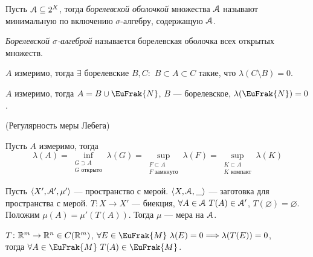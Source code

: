 \begin{definition}
    Пусть $\mathcal{A} \subseteq 2^X$, тогда \textit{борелевской оболочкой} множества $\mathcal{A}$
    называют минимальную по включению $\sigma$-алгебру, содержащую $\mathcal{A}$.
\end{definition}

\begin{definition}
    \textit{Борелевской $\sigma$-алгеброй} называется борелевская оболочка
    всех открытых множеств.
\end{definition}

\begin{corollary}
    $A$ измеримо, тогда $\exists$ борелевские $B, C\colon$ $B \subset A \subset C$
    такие, что $\lambda(C \setminus B) = 0$.
\end{corollary}

\begin{corollary}
    $A$ измеримо, тогда $A = B \cup \EuFrak{N}$, $B$ --- борелевское,
    $\lambda(\EuFrak{N}) = 0$.
\end{corollary}

\begin{corollary}(Регулярность меры Лебега)

    Пусть $A$ измеримо, тогда
\[
    \lambda(A) = \inf_{\substack{G \supset A \\ G \text{ открыто}}}{\lambda(G)}
    = \sup_{\substack{F \subset A \\ F \text{ замкнуто}}}{\lambda(F)}
    = \sup_{\substack{K \subset A \\ K \text{ компакт}}}{\lambda(K)}
\]
\end{corollary}

\begin{lemma}

    Пусть $\langle X', \mathcal{A}', \mu' \rangle$ --- пространство с мерой.
    $\langle X, \mathcal{A}, \_ \rangle$ --- заготовка для пространства с мерой.
    $T \colon X \to X'$ --- биекция, $\forall A \in \mathcal{A}~ T(A) \in \mathcal{A}'$,
    $T(\varnothing) = \varnothing$. Положим $\mu(A) = \mu'(T(A))$. Тогда
    $\mu$ --- мера на $\mathcal{A}$.
\end{lemma}

\begin{lemma}
    $T \colon \mathbb{R}^m \to \mathbb{R}^n \in C(\mathbb{R}^m)$, $\forall E \in \EuFrak{M}~ \lambda(E) = 0
    \Lra \lambda(T(E)) = 0$, \\ тогда $\forall A \in \EuFrak{M}~ T(A) \in \EuFrak{M}$.
\end{lemma}
